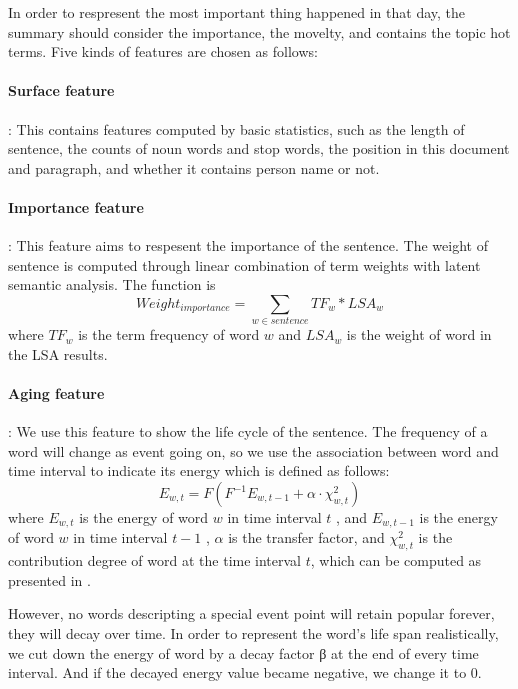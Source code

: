 \documentclass{acm_proc_article-sp}
\begin{document}
In order to respresent the most important thing happened in that day, the summary should consider the importance, the movelty, and contains the topic hot terms. 
Five kinds of features are chosen as follows:

\paragraph{Surface feature}: This contains features computed by basic statistics, such as the length of sentence, the counts of noun words and stop words, the position in this document and paragraph, and whether it contains person name or not. %

\paragraph{Importance feature}: This feature aims to respesent the importance of the sentence. The weight of sentence is computed through linear combination of term weights with latent semantic analysis. The function is 
\begin{equation}
Weight_{importance} = \sum_{w \in sentence}TF_w * LSA_w
\end{equation}
where $TF_w$ is the term frequency of word $w$ and $LSA_w$ is the weight of word in the LSA results.

\paragraph{Aging feature}: We use this feature to show the life cycle of the sentence. The frequency of a word will change as event going on, so we use the association between word  and time interval  to indicate its energy which is defined as follows:
\begin{equation}
  E_{w,t} =F(F^{-1}E_{w,t-1}+\alpha\cdot\chi^2_{w,t})
\end{equation}
where $E_{w,t}$ is the energy of word $w$  in time interval $t$ , and $E_{w,t-1}$  is the energy of word $w$ in time interval $t-1$ , $\alpha$ is the transfer factor, and $\chi^2_{w,t}$  is the contribution degree of word  at the time interval $t$, which can be computed as presented in \cite{2000-Swan-p49-56}. 

However, no words descripting a special event point will retain popular forever, they will decay over time. In order to represent the word's life span realistically, we cut down the energy of word by a decay factor β at the end of every time interval. And if the decayed energy value became negative, we change it to 0.
\end{document}
